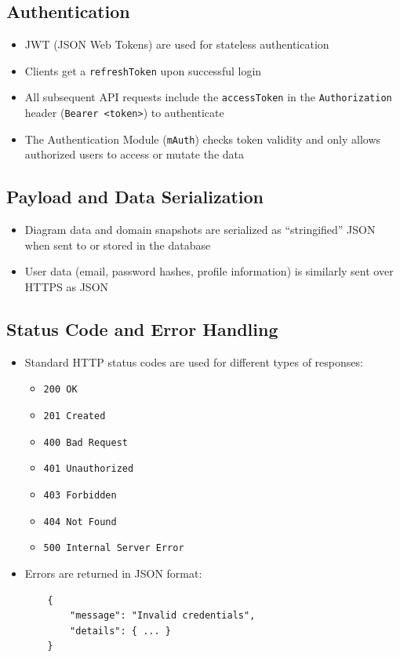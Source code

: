 \documentclass[12pt, titlepage]{article}
\begin{document}
\subsection{Authentication}

\begin{itemize}
    \item JWT (JSON Web Tokens) are used for stateless authentication
    \item Clients get a \texttt{refreshToken} upon successful login
    \item All subsequent API requests include the \texttt{accessToken} in the \texttt{Authorization} header (\texttt{Bearer <token>}) to authenticate
    \item The Authentication Module (\texttt{mAuth}) checks token validity and only allows authorized users to access or mutate the data
\end{itemize}

\subsection{Payload and Data Serialization}

\begin{itemize}
    \item Diagram data and domain snapshots are serialized as ``stringified'' JSON when sent to or stored in the database
    \item User data (email, password hashes, profile information) is similarly sent over HTTPS as JSON
\end{itemize}

\subsection{Status Code and Error Handling}

\begin{itemize}
    \item Standard HTTP status codes are used for different types of responses:
    \begin{itemize}
        \item \texttt{200 OK}
        \item \texttt{201 Created}
        \item \texttt{400 Bad Request}
        \item \texttt{401 Unauthorized}
        \item \texttt{403 Forbidden}
        \item \texttt{404 Not Found}
        \item \texttt{500 Internal Server Error}
    \end{itemize}
    \item Errors are returned in JSON format:
    \begin{verbatim}
    {
        "message": "Invalid credentials",
        "details": { ... }
    }
    \end{verbatim}
\end{itemize}
\end{document}
